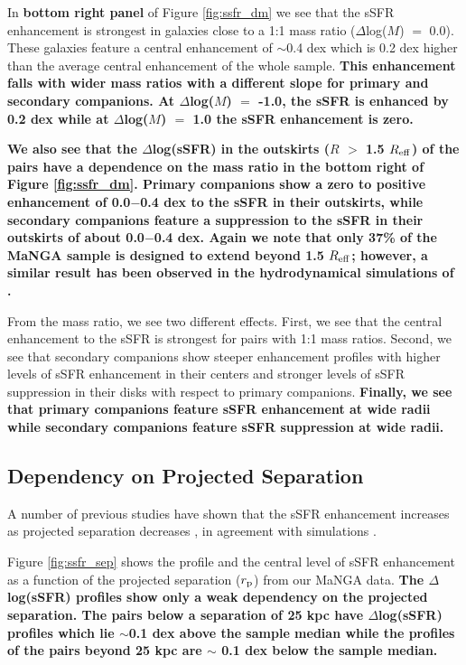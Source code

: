 \documentclass[iop,revtex4,twocolumn,apj,numberedappendix,appendixfloats]{emulateapj}
\newcommand{\reff}{$R_{\rm eff}$}
\begin{document}
In \textbf{bottom right panel} of Figure \ref{fig:ssfr_dm} we see that the sSFR enhancement is strongest in galaxies close to a 1:1 mass ratio ($\Delta$log($M$) $=$ 0.0). These galaxies feature a central enhancement of $\sim$0.4 dex which is 0.2 dex higher than the average central enhancement of the whole sample. \textbf{This enhancement falls with wider mass ratios with a different slope for primary and secondary companions. At $\Delta$log($M$) $=$ -1.0, the sSFR is enhanced by 0.2 dex while at $\Delta$log($M$) $=$ 1.0 the sSFR enhancement is zero.}

\textbf{We also see that the $\Delta$log(sSFR) in the outskirts ($R$ $>$ 1.5 \reff) of the pairs have a dependence on the mass ratio in the bottom right of Figure \ref{fig:ssfr_dm}. Primary companions show a zero to positive enhancement of 0.0$-$0.4 dex to the sSFR in their outskirts, while secondary companions feature a suppression to the sSFR in their outskirts of about 0.0$-$0.4 dex. Again we note that only 37\% of the MaNGA sample is designed to extend beyond 1.5 \reff; however, a similar result has been observed in the hydrodynamical simulations of \citet{Moreno:2015}. }

From the mass ratio, we see two different effects. First, we see that the central enhancement to the sSFR is strongest for pairs with 1:1 mass ratios. Second, we see that secondary companions show steeper enhancement profiles with higher levels of sSFR enhancement in their centers and stronger levels of sSFR suppression in their disks with respect to primary companions. \textbf{Finally, we see that primary companions feature sSFR enhancement at wide radii while secondary companions feature sSFR suppression at wide radii.}

\subsection{Dependency on Projected Separation}\label{sec:sep}

A number of previous studies have shown that the sSFR enhancement increases as projected separation decreases \citep[e.g.,][]{Li:2008, Ellison:2008, Scudder:2012, Patton:2013}, in agreement with simulations \citep{Scudder:2012}. 

Figure \ref{fig:ssfr_sep} shows the profile and the central level of sSFR enhancement as a function of the projected separation ($r_{\rm p}$) from our MaNGA data. \textbf{The $\Delta$log(sSFR) profiles show only a weak dependency on the projected separation. The pairs below a separation of 25 kpc have $\Delta$log(sSFR) profiles which lie $\sim$0.1 dex above the sample median while the profiles of the pairs beyond 25 kpc are $\sim$ 0.1 dex below the sample median. }
\end{document}
